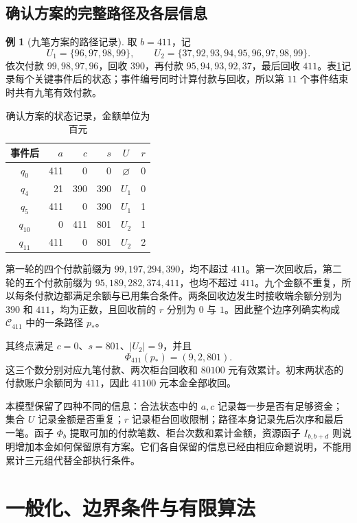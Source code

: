 \documentclass[UTF8,a4paper]{ctexbook}
\theoremstyle{definition}
\newtheorem{example}[theorem]{例}
\numberwithin{equation}{chapter}
\newcommand{\1}{\mathbf{1}}
\begin{document}
\section{确认方案的完整路径及各层信息}

\begin{example}[九笔方案的路径记录]\label{cat:actual-path}
取 $b=411$，记
\[
U_1=\{96,97,98,99\},\qquad
U_2=\{37,92,93,94,95,96,97,98,99\}.
\]
依次付款 $99,98,97,96$，回收 $390$，再付款 $95,94,93,92,37$，最后回收 $411$。表\ref{cat:actual-states}记录每个关键事件后的状态；事件编号同时计算付款与回收，所以第 $11$ 个事件结束时共有九笔有效付款。

\begin{table}[htbp]
\centering
\caption{确认方案的状态记录，金额单位为百元}
\label{cat:actual-states}
\begin{tabular}{crrrcc}
\toprule
事件后 & $a$ & $c$ & $s$ & $U$ & $r$\\
\midrule
$q_0$    & 411 & 0   & 0   & $\varnothing$ & 0\\
$q_4$    & 21  & 390 & 390 & $U_1$ & 0\\
$q_5$    & 411 & 0   & 390 & $U_1$ & 1\\
$q_{10}$ & 0   & 411 & 801 & $U_2$ & 1\\
$q_{11}$ & 411 & 0   & 801 & $U_2$ & 2\\
\bottomrule
\end{tabular}
\end{table}

第一轮的四个付款前缀为 $99,197,294,390$，均不超过 $411$。第一次回收后，第二轮的五个付款前缀为 $95,189,282,374,411$，也均不超过 $411$。九个金额不重复，所以每条付款边都满足余额与已用集合条件。两条回收边发生时接收端余额分别为 $390$ 和 $411$，均为正数，且回收前的 $r$ 分别为 $0$ 与 $1$。因此整个边序列确实构成 $\mathcal C_{411}$ 中的一条路径 $p_*$。

其终点满足 $c=0$、$s=801$、$|U_2|=9$，并且
\[
\Phi_{411}(p_*)=(9,2,801).
\]
这三个数分别对应九笔付款、两次柜台回收和 $80100$ 元有效累计。初末两状态的付款账户余额同为 $411$，因此 $41100$ 元本金全部收回。
\end{example}

本模型保留了四种不同的信息：合法状态中的 $a,c$ 记录每一步是否有足够资金；集合 $U$ 记录金额是否重复；$r$ 记录柜台回收限制；路径本身记录先后次序和最后一笔。函子 $\Phi_b$ 提取可加的付款笔数、柜台次数和累计金额，资源函子 $I_{b,b+d}$ 则说明增加本金如何保留原有方案。它们各自保留的信息已经由相应命题说明，不能用累计三元组代替全部执行条件。

\chapter{一般化、边界条件与有限算法}\label{gen:chapter}
\end{document}
